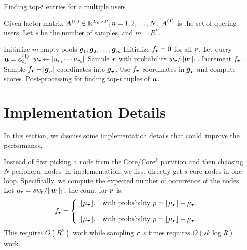 \documentclass[letterpaper]{article}
\newcommand{\V}[1]{{\boldsymbol{{\MakeLowercase{#1}}}}}
\newcommand{\RowVecA}[1]{\V{a}^{(#1)}_{i_#1*}}
\newcommand{\M}[1]{{\boldsymbol{{\MakeUppercase{#1}}}}}
\newcommand{\FacMat}[2]{\M{#1}^{(#2)}}
\newcommand{\norm}[2]{\|#1\|_{#2}}
\begin{document}
\begin{algorithm}[!ht]
    \caption{Finding top-$t$ entries for a multiple users}
    \label{alg:QuerySampling}
        Given factor matrix $\FacMat{A}{n}\in \mathbb{R}^{L_n\times R}, n = 1,2,\ldots,N$.
        $\FacMat{A}{1}$ is the set of quering users.
        Let $s$ be the number of samples, and $m=R^k$.
    \begin{algorithmic}[1]
    \State Initialize $m$ empty pools $\V{g}_1,\V{g}_2,\ldots,\V{g}_m$
    \State Initialize $f_{\V{r}} = 0$ for all $\V{r}$.
    \State Let query $\V{u}=\RowVecA{1}$
    \ForAll{$\V{r}$}
    \State $w_\V{r} \leftarrow |u_{r_1}\cdots u_{r_k}|$
    \EndFor
    \State Sample $\V{r}$ with probability $w_\V{r}/\norm{\V{W}}{1}$.
    \label{line:Indexes}
    \State  Increment $f_{\V{r}}$.
    \EndFor
    \ForAll {$\V{r}$}
    \If {$f_\V{r} > |\V{g}_\V{r}|$ }
    \State Sample $f_{\V{r}} - |\V{g}_{\V{r}}|$ coordinates into $\V{g}_{\V{r}}$.
    \EndIf
    \State Use $f_{\V{r}}$ coordinates in $\V{g}_{\V{r}}$ and compute scores.
    \EndFor
    \State Post-processing for finding top-$t$ tuples of $\V{u}$.
    \EndFor
    \end{algorithmic}
\end{algorithm}

\section{Implementation Details}
In this section, we discuss some implementation details that could improve the performance.

Instead of first picking a node from the Core/Core$^k$ partition 
and then choosing $N$ peripheral nodes, 
in implementation, we first directly get $s$ core nodes in one loop. 
Specifically, we compute the expected number of occurrence of the nodes.
Let $\mu_{\V{r}}=sw_\V{r}/\norm{\V{w}}{1}$, the count for $\V{r}$ is:
\begin{equation}f_\V{r}=
    \left\{
      \begin{array}{ll}
        \lfloor \mu_{\V{r}} \rfloor,
        & \hbox {with probability $p=\lceil \mu_{\V{r}} \rceil - \mu_{\V{r}}$} \\\\
        \lceil \mu_{\V{r}} \rceil,
        & \hbox{with probability $p=\lfloor \mu_{\V{r}} \rfloor - \mu_{\V{r}}$}
      \end{array}
    \right.
\end{equation}
This requires $O(R^k)$ work while sampling $\V{r}$ $s$ times requires $O(sk\log R)$ work.
\end{document}
